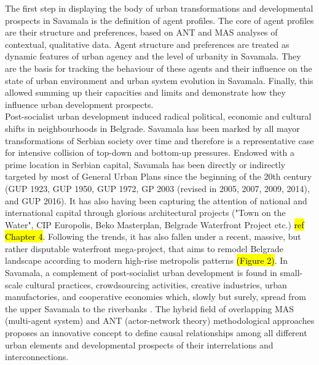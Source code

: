 \documentclass[11pt]{report}
\begin{document}
The first step in displaying the body of urban transformations and developmental prospects in Savamala is the definition of agent profiles. The core of agent profiles are their structure and preferences, based on ANT and MAS analyses of contextual, qualitative data. Agent structure and preferences are treated as dynamic features of urban agency and the level of urbanity in Savamala. They are the basis for tracking the behaviour of these agents and their influence on the state of urban environment and urban system evolution in Savamala. Finally, this allowed summing up their capacities and limits and demonstrate how they influence urban development prospects.
\\
Post-socialist urban development induced radical political, economic and cultural shifts in neighbourhoods in Belgrade. Savamala has been marked by all mayor transformations of Serbian society over time and therefore is a representative case for intensive collision of top-down and bottom-up pressures. Endowed with a prime location in Serbian capital, Savamala has been directly or indirectly targeted by most of General Urban Plans since the beginning of the 20th century (GUP 1923, GUP 1950, GUP 1972, GP 2003 (revised in 2005, 2007, 2009, 2014), and GUP 2016). It has also having been capturing the attention of national and international capital through glorious architectural projects ("Town on the Water", CIP Europolis, Beko Masterplan, Belgrade Waterfront Project etc.) \hl{ref Chapter 4}.
Following the trends, it has also fallen under a recent, massive, but rather disputable waterfront mega-project, that aims to remodel Belgrade landscape according to modern high-rise metropolis patterns \hl{(Figure 2)}.
In Savamala, a complement of post-socialist urban development is found in small-scale cultural practices, crowdsourcing activities, creative industries, urban manufactories, and cooperative economies which, slowly but surely, spread from the upper Savamala to the riverbanks \cite{(Cvetinovic et al., 2013)}. The hybrid field of overlapping MAS (multi-agent system) and ANT (actor-network theory) methodological approaches proposes an innovative concept to define causal relationships among all different urban elements and developmental prospects of their interrelations and interconnections.
\end{document}
